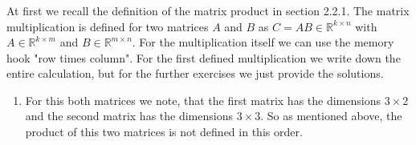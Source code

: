 \documentclass[solution]{tudexercise}
\begin{document}
			\subsubsection{}
				At first we recall the definition of the matrix product in section 2.2.1. The matrix multiplication is defined for two matrices $A$ and $B$ as $C = AB \in \mathbb{R}^{k \times n}$ with $A \in \mathbb{R}^{k \times m}$ and $B \in \mathbb{R}^{m \times n}$. For the multiplication itself we can use the memory hook "row times column". For the first defined multiplication we write down the entire calculation, but for the further exercises we just provide the solutions.
				\begin{enumerate}
				\item
				For this both matrices we note, that the first matrix has the dimensions $3 \times 2$ and the second matrix has the dimensions $3 \times 3$. So as mentioned above, the product of this two matrices is not defined in this order.
				

\end{enumerate}
\end{document}
